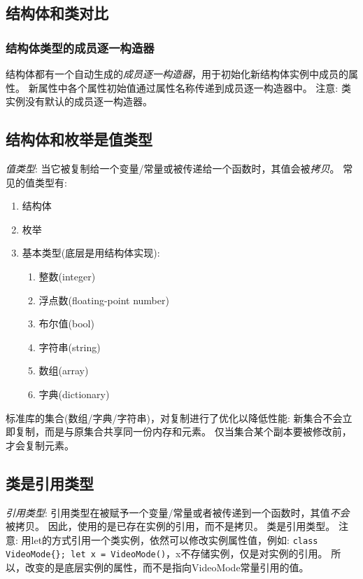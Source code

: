 \documentclass{../main.tex}{subfiles}
\begin{document}
\subsection{结构体和类对比}
\subsubsection{结构体类型的成员逐一构造器}
结构体都有一个自动生成的\emph{成员逐一构造器}，用于初始化新结构体实例中成员的属性。
新属性中各个属性初始值通过属性名称传递到成员逐一构造器中。
注意: 类实例没有默认的成员逐一构造器。

\subsection{结构体和枚举是值类型}
\emph{值类型}: 当它被复制给一个变量/常量或被传递给一个函数时，其值会被\emph{拷贝}。
常见的值类型有:
\begin{enumerate}[itemsep=0pt, parsep=0pt, topsep=0pt, partopsep=0pt]
  \item 结构体
  \item 枚举
  \item 基本类型(底层是用结构体实现):
    \begin{enumerate}[itemsep=0pt, parsep=0pt, topsep=0pt, partopsep=0pt]
      \item 整数(integer)
      \item 浮点数(floating-point number)
      \item 布尔值(bool)
      \item 字符串(string)
      \item 数组(array)
      \item 字典(dictionary)
    \end{enumerate}
\end{enumerate}
标准库的集合(数组/字典/字符串)，对复制进行了优化以降低性能:
新集合不会立即复制，而是与原集合共享同一份内存和元素。
仅当集合某个副本要被修改前，才会复制元素。

\subsection{类是引用类型}
\emph{引用类型}: 引用类型在被赋予一个变量/常量或者被传递到一个函数时，其值\emph{不会}被拷贝。
因此，使用的是已存在实例的引用，而不是拷贝。
类是引用类型。
注意: 用let的方式引用一个类实例，依然可以修改实例属性值，例如:
\lstinline|class VideoMode{}; let x = VideoMode()|，x不存储实例，仅是对实例的引用。
所以，改变的是底层实例的属性，而不是指向VideoMode常量引用的值。
\end{document}
